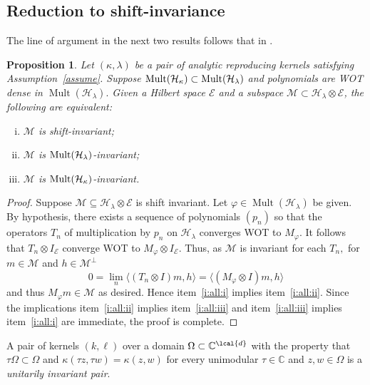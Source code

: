 \documentclass[a4paper,reqno,index]{amsart}
\newcommand{\df}[1]{{\textit{#1}}{\index{#1}}}
\numberwithin{equation}{section}
\newcommand{\CC}{\mathbb{C}}
\newcommand{\Mult}{\operatorname{Mult}}
\newcommand{\cM}{\mathcal{M}}
\newcommand{\cH}{\mathcal{H}}
\newcommand{\HSE}{\mathcal{E}}
\newcommand{\genk}{\kappa} %
\newcommand{\genl}{\lambda} %
\newtheorem{proposition}[theorem]{Proposition}
\theoremstyle{definition}
\begin{document}
\subsection{Reduction to shift-invariance}

The line of argument in the next two results follows that  in \cite[Proposition 2.5]{Beurlingfactor}.

 

\begin{proposition} 
  \label{allequiv} 
   Let $(\genk, \genl)$ be a pair of analytic reproducing kernels satisfying Assumption~\ref{assume}. Suppose $\textup{Mult}(\mathcal{H}_{\genk})\subset \textup{Mult}(\mathcal{H}_{\genl})$ 
   and polynomials are WOT dense in $\Mult(\cH_{\genl }).$   Given a Hilbert space $\mathcal{E}$ and a  subspace $\mathcal{M}\subset\mathcal{H}_{\genl}\otimes \mathcal{E}$, the following are equivalent:
\begin{enumerate}[(i)]\itemsep=6pt
    \item \label{i:all:i}
       $\mathcal{M}$ is shift-invariant; 
    \item \label{i:all:ii}
        $\mathcal{M}$ is  $\textup{Mult}(\mathcal{H}_{\genl})$-invariant;
    \item \label{i:all:iii}
        $\mathcal{M}$ is  $\textup{Mult}(\mathcal{H}_{\genk})$-invariant.
\end{enumerate}
\end{proposition}

 

\begin{proof}
   Suppose $\cM\subseteq \cH_\genl\otimes \HSE$
 is shift invariant.    Let $\varphi\in \Mult(\cH_\genl)$ be given. By hypothesis, there exists
 a sequence of polynomials $(p_n)$  so that the operators $T_n$ of multiplication by $p_n$ on $\cH_\genl$ converges 
 WOT to $M_\varphi.$   It follows that $T_n\otimes I_{\HSE}$ converge
 WOT to $M_\varphi \otimes I_{\HSE}.$  Thus, as $\cM$ is invariant for each $T_n,$  for $m\in \cM$ and $h\in\cM^\bot$ 
\[
 0 = \lim_n  \langle (T_n\otimes I) m , h \rangle  
 = \langle (M_\varphi \otimes I) m, h \rangle
\] 
 and  thus $M_\varphi m\in \cM$ as desired.  Hence item~\ref{i:all:i} implies item~\ref{i:all:ii}. 
 Since the implications item~\ref{i:all:ii} implies item~\ref{i:all:iii} and item~\ref{i:all:iii} implies item~\ref{i:all:i}
 are immediate, the proof is complete.
\end{proof}

 


A pair of kernels $(k,\ell)$ over a domain $\Omega\subset \CC^{\lcal{d}}$ with the property that $\tau \Omega\subset \Omega$
and $\genk(\tau z,\tau w) =\genk(z,w)$ for every unimodular
$\tau\in\CC$ and $z, w\in\Omega$ is a \df{unitarily invariant pair}.
\end{document}
